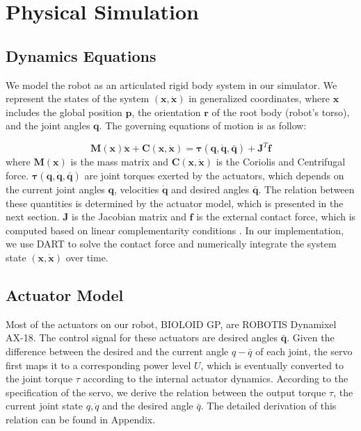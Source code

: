 \section{Physical Simulation}

\subsection{Dynamics Equations}

We model the robot as an articulated rigid body system in our simulator. We represent the states of the system $(\mathbf{x}, \dot{\mathbf{x}})$ in generalized coordinates, where $\mathbf{x}$ includes the global position $\mathbf{p}$, the orientation $\mathbf{r}$ of the root body (robot's torso), and the joint angles $\mathbf{q}$. The governing equations of motion is as follow:

\begin{equation}
\label{eq:robotdynamics}
\mathbf{M}(\mathbf{x})\mathbf{\ddot{x}}+\mathbf{C}(\mathbf{x},\mathbf{\dot{x}})=\mathbf{\tau}(\mathbf{q}, \dot{\mathbf{q}}, \bar{\mathbf{q}})+\mathbf{J}^T\mathbf{f}
\end{equation}
where $\mathbf{M}(\mathbf{x})$ is the mass matrix and $\mathbf{C}(\mathbf{x},\mathbf{\dot{x}})$ is the Coriolis and Centrifugal force. $\mathbf{\tau}(\mathbf{q}, \dot{\mathbf{q}}, \bar{\mathbf{q}})$ are joint torques exerted by the actuators, which depends on the current joint angles $\mathbf{q}$, velocities $\dot{\mathbf{q}}$ and desired angles $\bar{\mathbf{q}}$. The relation between these quantities is determined by the actuator model, which is presented in the next section. $\mathbf{J}$ is the Jacobian matrix and $\mathbf{f}$ is the external contact force, which is computed based on linear complementarity conditions \cite{Tan:2012b}. In our implementation, we use DART to solve the contact force and numerically integrate the system state $(\mathbf{x}, \dot{\mathbf{x}})$ over time.

\subsection{Actuator Model}
\label{sec:motorDynamics}
Most of the actuators on our robot, BIOLOID GP, are ROBOTIS Dynamixel AX-18. The control signal for these actuators are desired angles $\bar{\mathbf{q}}$. Given the difference between the desired and the current angle ${q-\bar{q}}$ of each joint, the servo first maps it to a corresponding power level $U$, which is eventually converted to the joint torque $\tau$ according to the internal actuator dynamics. According to the specification of the servo, we derive the relation between the output torque $\tau$, the current joint state $q, \dot{q}$ and the desired angle $\bar{q}$. The detailed derivation of this relation can be found in Appendix.

